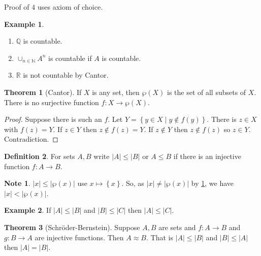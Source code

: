 \documentclass{article}
\newcommand{\N}{\mathbb{N}}
\newcommand{\Q}{\mathbb{Q}}
\newcommand{\R}{\mathbb{R}}
\newcommand{\rb}[1]{\left( #1 \right)}
\newcommand{\cb}[1]{\left\{ #1 \right\}}
\newcommand{\abs}[1]{\left\lvert #1 \right\rvert}
\theoremstyle{definition}\newtheorem{definition}{Definition}[subsection]
\theoremstyle{definition}\newtheorem{remark}[definition]{Remark}
\theoremstyle{definition}\newtheorem*{example}{Example}
\theoremstyle{definition}\newtheorem*{note}{Note}
\newtheorem{theorem}[definition]{Theorem}
\begin{document}
Proof of $ 4 $ uses axiom of choice.

\begin{example}
\hfill
\begin{enumerate}
\item $ \Q $ is countable.
\item $ \cup_{n \in \N} A^n $ is countable if $ A $ is countable.
\item $ \R $ is not countable by Cantor.
\end{enumerate}
\end{example}

\begin{theorem}[Cantor]
\label{thm:3.1.4}
If $ X $ is any set, then $ \wp\rb{X} $ is the set of all subsets of $ X $. There is no surjective function $ f : X \to \wp\rb{X} $.
\end{theorem}

\begin{proof}
Suppose there is such an $ f $. Let $ Y = \cb{y \in X \mid y \notin f\rb{y}} $. There is $ z \in X $ with $ f\rb{z} = Y $. If $ z \in Y $ then $ z \notin f\rb{z} = Y $. If $ z \notin Y $ then $ z \notin f\rb{z} $ so $ z \in Y $. Contradiction.
\end{proof}


\begin{definition}
For sets $ A, B $ write $ \abs{A} \le \abs{B} $ or $ A \le B $ if there is an injective function $ f : A \to B $.
\end{definition}

\begin{note}
$ \abs{x} \le \abs{\wp\rb{x}} $ use $ x \mapsto \cb{x} $. So, as $ \abs{x} \ne \abs{\wp\rb{x}} $ by \ref{thm:3.1.4}, we have $ \abs{x} < \abs{ \wp\rb{x}} $.
\end{note}

\begin{example}
If $ \abs{A} \le \abs{B} $ and $ \abs{B} \le \abs{C} $ then $ \abs{A} \le \abs{C} $.
\end{example}

\begin{theorem}[Schröder-Bernstein]
\label{thm:3.1.6}
Suppose $ A, B $ are sets and $ f : A \to B $ and $ g : B \to A $ are injective functions. Then $ A \approx B $. That is $ \abs{A} \le \abs{B} $ and $ \abs{B} \le \abs{A} $ then $ \abs{A} = \abs{B} $.
\end{theorem}
\end{document}
